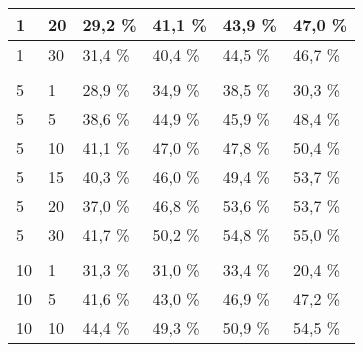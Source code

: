 \begin{table}[!htb]
\begin{tabular}{llllll}
\multicolumn{1}{|l|}{1}   & \multicolumn{1}{l|}{20}  & \multicolumn{1}{l|}{29,2 \%} & \multicolumn{1}{l|}{41,1 \%} & \multicolumn{1}{l|}{43,9 \%} & \multicolumn{1}{l|}{47,0 \%} \\ \hline
\multicolumn{1}{|l|}{1}   & \multicolumn{1}{l|}{30}  & \multicolumn{1}{l|}{31,4 \%} & \multicolumn{1}{l|}{40,4 \%} & \multicolumn{1}{l|}{44,5 \%} & \multicolumn{1}{l|}{46,7 \%} \\ \hline
 &  & & & & \\ \hline
\multicolumn{1}{|l|}{5}   & \multicolumn{1}{l|}{1} & \multicolumn{1}{l|}{28,9 \%} & \multicolumn{1}{l|}{34,9 \%} & \multicolumn{1}{l|}{38,5 \%} & \multicolumn{1}{l|}{30,3 \%} \\ \hline
\multicolumn{1}{|l|}{5}   & \multicolumn{1}{l|}{5} & \multicolumn{1}{l|}{38,6 \%} & \multicolumn{1}{l|}{44,9 \%} & \multicolumn{1}{l|}{45,9 \%} & \multicolumn{1}{l|}{48,4 \%} \\ \hline
\multicolumn{1}{|l|}{5}   & \multicolumn{1}{l|}{10}  & \multicolumn{1}{l|}{41,1 \%} & \multicolumn{1}{l|}{47,0 \%} & \multicolumn{1}{l|}{47,8 \%} & \multicolumn{1}{l|}{50,4 \%} \\ \hline
\multicolumn{1}{|l|}{5}   & \multicolumn{1}{l|}{15}  & \multicolumn{1}{l|}{40,3 \%} & \multicolumn{1}{l|}{46,0 \%} & \multicolumn{1}{l|}{49,4 \%} & \multicolumn{1}{l|}{53,7 \%} \\ \hline
\multicolumn{1}{|l|}{5}   & \multicolumn{1}{l|}{20}  & \multicolumn{1}{l|}{37,0 \%} & \multicolumn{1}{l|}{46,8 \%} & \multicolumn{1}{l|}{53,6 \%} & \multicolumn{1}{l|}{53,7 \%} \\ \hline
\multicolumn{1}{|l|}{5}   & \multicolumn{1}{l|}{30}  & \multicolumn{1}{l|}{41,7 \%} & \multicolumn{1}{l|}{50,2 \%} & \multicolumn{1}{l|}{54,8 \%} & \multicolumn{1}{l|}{55,0 \%} \\ \hline
 &  & & & & \\ \hline
\multicolumn{1}{|l|}{10}  & \multicolumn{1}{l|}{1} & \multicolumn{1}{l|}{31,3 \%} & \multicolumn{1}{l|}{31,0 \%} & \multicolumn{1}{l|}{33,4 \%} & \multicolumn{1}{l|}{20,4 \%} \\ \hline
\multicolumn{1}{|l|}{10}  & \multicolumn{1}{l|}{5} & \multicolumn{1}{l|}{41,6 \%} & \multicolumn{1}{l|}{43,0 \%} & \multicolumn{1}{l|}{46,9 \%} & \multicolumn{1}{l|}{47,2 \%} \\ \hline
\multicolumn{1}{|l|}{10}  & \multicolumn{1}{l|}{10}  & \multicolumn{1}{l|}{44,4 \%} & \multicolumn{1}{l|}{49,3 \%} & \multicolumn{1}{l|}{50,9 \%} & \multicolumn{1}{l|}{54,5 \%} \\ \hline

\end{tabular}
\end{table}
